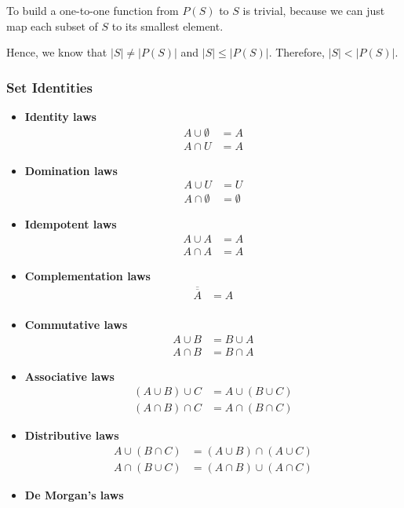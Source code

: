 \documentclass[a4paper,12pt]{article}
\begin{document}
To build a one-to-one function from $P(S)$ to $S$ is trivial, because we can just map each subset of $S$ to its smallest element.

Hence, we know that $|S| \neq |P(S)|$ and $|S| \leq |P(S)|$.
Therefore, $|S| < |P(S)|$.

\subsubsection{Set Identities}

\begin{itemize}
	\item \textbf{Identity laws}
		\begin{align*}
			A \cup \emptyset &= A \\
			A \cap U &= A
		\end{align*}
	\item \textbf{Domination laws}
		\begin{align*}
			A \cup U &= U \\
			A \cap \emptyset &= \emptyset
		\end{align*}
	\item \textbf{Idempotent laws}
		\begin{align*}
			A \cup A &= A \\
			A \cap A &= A
		\end{align*}
	\item \textbf{Complementation laws}
		\begin{align*}
			\overline{\overline{A}} &= A \\
		\end{align*}
	\item \textbf{Commutative laws}
		\begin{align*}
			A \cup B &= B \cup A \\
			A \cap B &= B \cap A
		\end{align*}
	\item \textbf{Associative laws}
		\begin{align*}
			(A \cup B) \cup C &= A \cup (B \cup C) \\
			(A \cap B) \cap C &= A \cap (B \cap C)
		\end{align*}
	\item \textbf{Distributive laws}
		\begin{align*}
			A \cup (B \cap C) &= (A \cup B) \cap (A \cup C) \\
			A \cap (B \cup C) &= (A \cap B) \cup (A \cap C)
		\end{align*}
	\item \textbf{De Morgan's laws}

\end{itemize}
\end{document}
